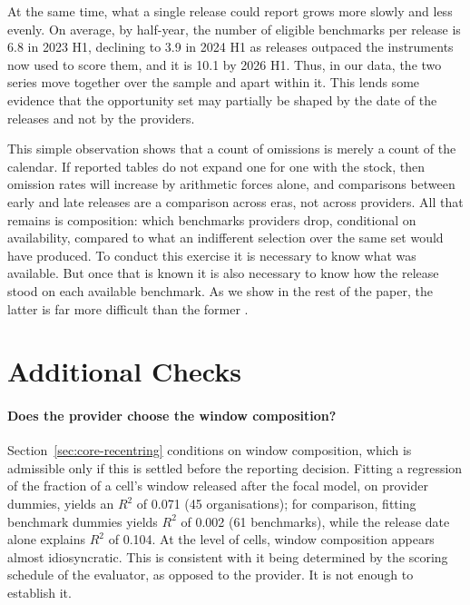 \documentclass{article}
\begin{document}
At the same time, what a single release could report grows more slowly and less evenly. On average, by half-year, the number of eligible benchmarks per release is 6.8 in 2023 H1, declining to 3.9 in 2024 H1 as releases outpaced the instruments now used to score them, and it is 10.1 by 2026 H1. Thus, in our data, the two series move together over the sample and apart within it. This lends some evidence that the opportunity set may partially be shaped by the date of the releases and not by the providers.

This simple observation shows that a count of omissions is merely a count of the calendar. If reported tables do not expand one for one with the stock, then omission rates will increase by arithmetic forces alone, and comparisons between early and late releases are a comparison across eras, not across providers. All that remains is composition: which benchmarks providers drop, conditional on availability, compared to what an indifferent selection over the same set would have produced. To conduct this exercise it is necessary to know what was available. But once that is known it is also necessary to know how the release stood on each available benchmark. As we show in the rest of the paper, the latter is far more difficult than the former \citep{dranove2010}.

\section{Additional Checks}\label{sec:supporting}

\paragraph{Does the provider choose the window composition?}
Section~\ref{sec:core-recentring} conditions on window composition, which is admissible only if this is settled before the reporting decision. Fitting a regression of the fraction of a cell's window released after the focal model, on provider dummies, yields an $R^2$ of 0.071 (45 organisations); for comparison, fitting benchmark dummies yields $R^2$ of 0.002 (61 benchmarks), while the release date alone explains $R^2$ of 0.104. At the level of cells, window composition appears almost idiosyncratic. This is consistent with it being determined by the scoring schedule of the evaluator, as opposed to the provider. It is not enough to establish it.
\end{document}
